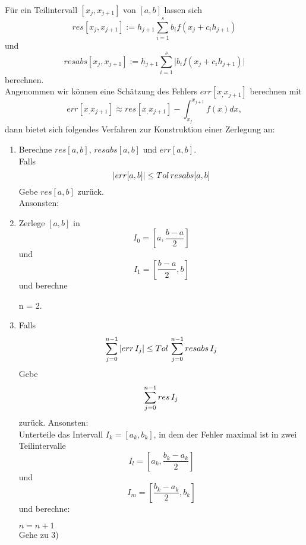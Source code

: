 \begin{nothing}
Für ein Teilintervall $[x_j, x_{j+1}]$ von $[a,b]$ lassen sich 
$$res[x_j, x_{j+1}] := h_{j+1} \sum_{i=1}^s b_i f(x_j + c_i h_{j+1})$$
und
$$ resabs[x_j, x_{j+1}] := h_{j+1} \sum_{i=1}^s \vert b_i f(x_j + c_i h_{j+1}) \vert$$
berechnen.\\
Angenommen wir können eine Schätzung des Fehlers $err[x_, x_{j+1}]$ berechnen mit
$$err[x_, x_{j+1}] \approx res[x_, x_{j+1}] - \int_{x_j}^{x_{j+1}} f(x) dx,$$
dann bietet sich folgendes Verfahren zur Konstruktion einer Zerlegung an:
\begin{enumerate}
  \item Berechne $res[a,b]$, $resabs[a,b]$ und $err[a, b]$. \\
    Falls 
    $$\vert err[a,b] \vert \leq Tol \thinspace resabs[a,b]$$
    Gebe $res[a,b]$ zurück.\\
    Ansonsten:
    
  \item Zerlege $[a,b]$ in 
    $$I_0 = \left[a,\frac{b-a}{2}\right]$$
    und
    $$I_1 = \left[ \frac{b-a}{2}, b \right]$$
    und berechne 
    n = 2.
    
  \item Falls 
    $$ \sum_{j=0}^{n-1} \vert err \thinspace I_j \vert \leq Tol \thinspace \sum_{j=0}^{n-1} resabs \thinspace I_j$$
    Gebe
    $$ \sum_{j=0}^{n-1} res \thinspace I_j$$
    zurück. Ansonsten: \\
    Unterteile das Intervall $I_k = [a_k, b_k]$, in dem der Fehler maximal ist in zwei Teilintervalle 
    $$I_l = \left[a_k,\frac{b_k-a_k}{2}\right]$$
    und
    $$I_m = \left[ \frac{b_k-a_k}{2}, b_k \right]$$
    und berechne:
    $n =n+1$ \\
    Gehe zu 3)
\end{enumerate}
\end{nothing}

